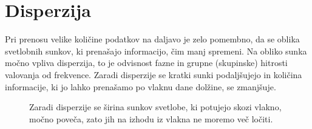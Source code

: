 
\section{Disperzija}
\label{chap:Disperzija}
Pri prenosu velike količine podatkov na daljavo je zelo pomembno, da
se oblika svetlobnih sunkov, ki prenašajo informacijo, čim manj spremeni.
Na obliko sunka močno vpliva disperzija, to je odvisnost fazne in grupne (skupinske) hitrosti
valovanja od frekvence. Zaradi disperzije se kratki sunki podaljšujejo in količina 
informacije, ki jo lahko prenašamo po vlaknu dane dolžine, se zmanjšuje.
\begin{figure}[h]
\centering
\def\svgwidth{120truemm} 
 
\caption{Zaradi disperzije se širina sunkov svetlobe, ki potujejo skozi vlakno, 
močno poveča, zato jih na izhodu iz vlakna ne moremo več ločiti.}
\label{fig:disp}
\end{figure}

